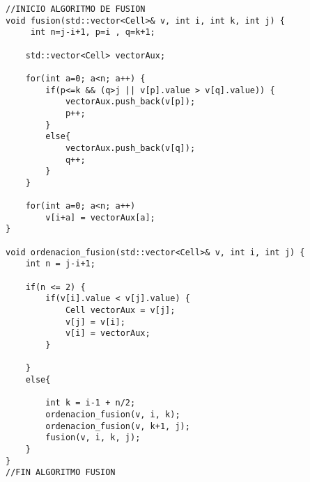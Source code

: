 \begin{lstlisting}
//INICIO ALGORITMO DE FUSION
void fusion(std::vector<Cell>& v, int i, int k, int j) {
     int n=j-i+1, p=i , q=k+1;

    std::vector<Cell> vectorAux;

    for(int a=0; a<n; a++) {
        if(p<=k && (q>j || v[p].value > v[q].value)) {
            vectorAux.push_back(v[p]);
            p++;
        }
        else{
            vectorAux.push_back(v[q]);
            q++;
        }
    }

    for(int a=0; a<n; a++)
        v[i+a] = vectorAux[a];
}

void ordenacion_fusion(std::vector<Cell>& v, int i, int j) {
    int n = j-i+1;

    if(n <= 2) {
        if(v[i].value < v[j].value) {
            Cell vectorAux = v[j];
            v[j] = v[i];
            v[i] = vectorAux; 
        }
    
    }
    else{

        int k = i-1 + n/2;
        ordenacion_fusion(v, i, k);
        ordenacion_fusion(v, k+1, j);
        fusion(v, i, k, j);
    }
}
//FIN ALGORITMO FUSION

\end{lstlisting}
